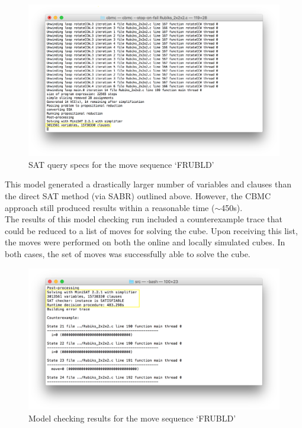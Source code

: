 \documentclass{article}
\begin{document}
\begin{figure}[h]
\includegraphics[width=\textwidth]{pics/2x2x2_SAT_Query_Specs.png}
\caption{SAT query specs for the move sequence `FRUBLD'}
\end{figure}

\noindent This model generated a drastically larger number of variables and clauses than the direct SAT method (via SABR) outlined above. However, the CBMC approach still produced results within a reasonable time ($\sim$450s).\\

\noindent The results of this model checking run included a counterexample trace that could be reduced to a list of moves for solving the cube. Upon receiving this list, the moves were performed on both the online and locally simulated cubes. In both cases, the set of moves was successfully able to solve the cube.

\begin{figure}[h]
\includegraphics[width=\textwidth]{pics/2x2x2_Successful_Solve.png}
\caption{Model checking results for the move sequence `FRUBLD'}
\end{figure}
\end{document}
